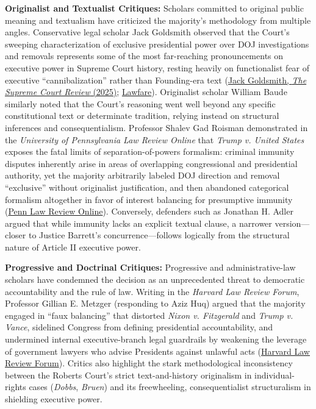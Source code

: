\documentclass[12pt]{article}
\begin{document}
\textbf{Originalist and Textualist Critiques:} Scholars committed to original public meaning and textualism have criticized the majority's methodology from multiple angles. Conservative legal scholar Jack Goldsmith observed that the Court's sweeping characterization of exclusive presidential power over DOJ investigations and removals represents some of the most far-reaching pronouncements on executive power in Supreme Court history, resting heavily on functionalist fear of executive ``cannibalization'' rather than Founding-era text (\href{https://www.journals.uchicago.edu/doi/10.1086/735878}{Jack Goldsmith, \textit{The Supreme Court Review} (2025)}; \href{https://www.lawfaremedia.org/article/broad-reflections-on-trump-v.-united-states}{Lawfare}). Originalist scholar William Baude similarly noted that the Court's reasoning went well beyond any specific constitutional text or determinate tradition, relying instead on structural inferences and consequentialism. Professor Shalev Gad Roisman demonstrated in the \textit{University of Pennsylvania Law Review Online} that \textit{Trump v. United States} exposes the fatal limits of separation-of-powers formalism: criminal immunity disputes inherently arise in areas of overlapping congressional and presidential authority, yet the majority arbitrarily labeled DOJ direction and removal ``exclusive'' without originalist justification, and then abandoned categorical formalism altogether in favor of interest balancing for presumptive immunity (\href{https://pennlawreview.com/2025/02/03/trump-v-united-states-and-the-separation-of-powers/}{Penn Law Review Online}). Conversely, defenders such as Jonathan H. Adler argued that while immunity lacks an explicit textual clause, a narrower version---closer to Justice Barrett's concurrence---follows logically from the structural nature of Article II executive power.

\textbf{Progressive and Doctrinal Critiques:} Progressive and administrative-law scholars have condemned the decision as an unprecedented threat to democratic accountability and the rule of law. Writing in the \textit{Harvard Law Review Forum}, Professor Gillian E. Metzger (responding to Aziz Huq) argued that the majority engaged in ``faux balancing'' that distorted \textit{Nixon v. Fitzgerald} and \textit{Trump v. Vance}, sidelined Congress from defining presidential accountability, and undermined internal executive-branch legal guardrails by weakening the leverage of government lawyers who advise Presidents against unlawful acts (\href{https://harvardlawreview.org/forum/vol-138/disqualification-immunity-and-the-presidency/}{Harvard Law Review Forum}). Critics also highlight the stark methodological inconsistency between the Roberts Court's strict text-and-history originalism in individual-rights cases (\textit{Dobbs}, \textit{Bruen}) and its freewheeling, consequentialist structuralism in shielding executive power.
\end{document}

